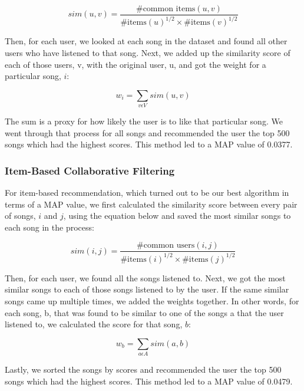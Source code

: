 \documentclass[12pt,preprint]{aastex}
\begin{document}
\begin{equation}
sim(u,v) = \frac{\text{\# common items}(u, v)}{{\text{\# items}(u)}^{1/2} \times {\text{\# items}(v)}^{1/2}}
\end{equation}

Then, for each user, we looked at each song in the dataset and found all other users who have listened to that song. Next, we added up the similarity score of each of those users, v, with the original user, u, and got the weight for a particular song, $i$:  

$$w_i = \sum_{v \epsilon V} sim(u, v)$$

The sum is a proxy for how likely the user is to like that particular song. We went through that process for all songs and recommended the user the top 500 songs which had the highest scores. This method led to a MAP value of 0.0377.

\subsubsection{Item-Based Collaborative Filtering}

For item-based recommendation, which turned out to be our best algorithm in terms of a MAP value, we first calculated the similarity score between every pair of songs, $i$ and $j$, using the equation below and saved the most similar songs to each song in the process:

\begin{equation}
sim(i,j) = \frac{\text{\# common users}(i, j)}{{\text{\# items}(i)}^{1/2} \times {\text{\# items}(j)}^{1/2}}
\end{equation}

Then, for each user, we found all the songs listened to. Next, we got the most similar songs to each of those songs listened to by the user. If the same similar songs came up multiple times, we added the weights together. In other words, for each song, b, that was found to be similar to one of the songs a that the user listened to, we calculated the score for that song, $b$:

$$w_b = \sum_{a \epsilon A} sim(a, b)$$

Lastly, we sorted the songs by scores and recommended the user the top 500 songs which had the highest scores. This method led to a MAP value of 0.0479.


\end{document}
